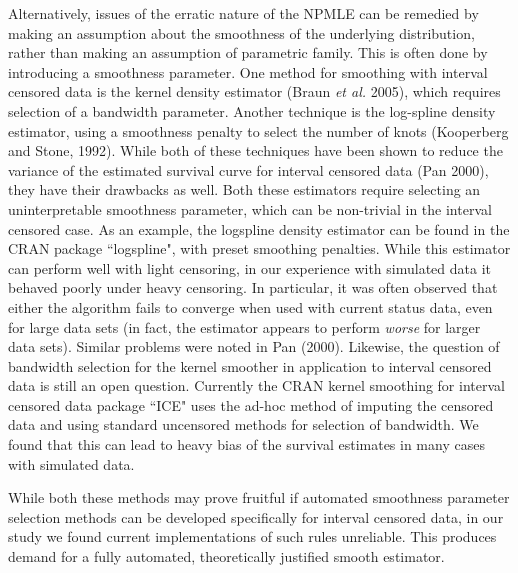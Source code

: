 \documentclass[10pt]{article}
\begin{document}
	Alternatively, issues of the erratic nature of the NPMLE can be remedied by making an assumption about the smoothness of the underlying distribution, rather than making an assumption of parametric family.  This is often done by introducing a smoothness parameter. One method for smoothing with interval censored data is the kernel density estimator (Braun \emph{et al.} 2005), which requires selection of a bandwidth parameter. Another technique is the log-spline density estimator, using a smoothness penalty to select the number of knots (Kooperberg and Stone, 1992). While both of these techniques have been shown to reduce the variance of the estimated survival curve for interval censored data (Pan 2000), they have their drawbacks as well. Both these estimators require selecting an uninterpretable smoothness parameter, which can be non-trivial in the interval censored case. As an example, the logspline density estimator can be found in the CRAN package  ``logspline", with preset smoothing penalties. While this estimator can perform well with light censoring, in our experience with simulated data it behaved poorly under heavy censoring. In particular, it was often observed that either the algorithm fails to converge when used with current status data, even for large data sets (in fact, the estimator appears to perform \emph{worse} for larger data sets). Similar problems were noted in Pan (2000).  Likewise, the question of bandwidth selection for the kernel smoother in application to interval censored data is still an open question. Currently the CRAN kernel smoothing for interval censored data package ``ICE" uses the ad-hoc method of imputing the censored data and using standard uncensored methods for selection of bandwidth. We found that this can lead to heavy bias of the survival estimates in many cases with simulated data.  
	 
	 While both these methods may prove fruitful if automated smoothness parameter selection methods can be developed specifically for interval censored data, in our study we found current implementations of such rules unreliable. This produces demand for a fully automated, theoretically justified smooth estimator. 
		
\end{document}
